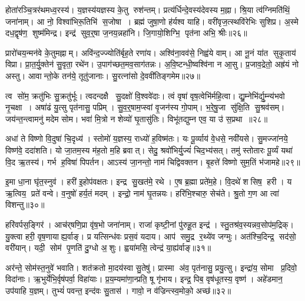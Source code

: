होता॑रञ्चि॒त्रर॑थमध्व॒रस्य॑।
य॒ज्ञस्य॑यज्ञस्य के॒तु रुश॑न्तम्।
प्रत्य॑र्धिन्दे॒वस्य॑देवस्य म॒ह्ना।
श्रि॒या त्व॑ग्निमति॑थिं॒ जना॑नाम्।
आ नो॒ विश्वा॑भिरू॒तिभि॑ स॒जोषा।
ब्रह्म॑ जुषा॒णो ह॑र्यश्व याहि।
वरी॑वृज॒त्स्थवि॑रेभिः सुशिप्र।
अ॒स्मे दध॒द्वृष॑ण॒ शुष्म॑मिन्द्र।
इन्द्र॑ सुव॒र्॒षा ज॒नय॒न्नहा॑नि।
जि॒गायो॒शिग्भि॒ पृत॑ना अभि॒ श्रीः॥२६॥

प्रारो॑चय॒न्मन॑वे के॒तुमह्नाम्।
अवि॑न्द॒ज्ज्योति॑र्बृह॒ते रणा॑य।
अश्वि॑ना॒वव॑से॒ निह्व॑ये वाम्।
आ नू॒नं या॑त सुकृ॒ताय॑ विप्रा।
प्रा॒त॒र्यु॒क्तेन॑ सु॒वृता॒ रथे॑न।
उ॒पाग॑च्छत॒मव॒साग॑तन्नः।
अ॒वि॒ष्टन्धी॒ष्वश्वि॑ना न आ॒सु।
प्र॒जाव॒द्रेतो॒ अह्र॑यं नो अस्तु।
आवान्तो॒के तन॑ये॒ तूतु॑जानाः।
सु॒रत्ना॑सो दे॒ववी॑तिङ्गमेम॥२७॥

त्व सो॑म॒ क्रतु॑भिः सु॒क्रतु॑र्भूः।
त्वदन्दक्षै सु॒दक्षो॑ वि॒श्ववे॑दाः।
त्वं वृषा॑ वृष॒त्वेभि॑र्महि॒त्वा।
द्यु॒म्नेभि॑र्द्यु॒म्न्य॑भवो नृ॒चक्षा।
अषा॑ढं यु॒त्सु पृत॑नासु॒ पप्रिम्।
सु॒व॒र्॒षाम॒प्स्वां वृ॒जन॑स्य गो॒पाम्।
भ॒रे॒षु॒जा सु॑क्षि॒ति सु॒श्रव॑सम्।
जय॑न्त॒न्त्वामनु॑ मदेम सोम।
भवा॑ मि॒त्रो न शेव्यो॑ घृ॒तासु॑तिः।
विभू॑तद्युम्न एव॒ या उ॑ स॒प्रथा॥२८॥

अधा॑ ते विष्णो वि॒दुषा॑ चि॒दृध्य॑।
स्तोमो॑ य॒ज्ञस्य॒ राध्यो॑ ह॒विष्म॑तः।
यः पू॒र्व्याय॑ वे॒धसे॒ नवी॑यसे।
सु॒मज्जा॑नये॒ विष्ण॑वे॒ ददा॑शति।
यो जा॒तम॒स्य म॑ह॒तो म॒हि ब्रवात्।
सेदु॒ श्रवो॑भिर्यु॒ज्यं॑         चिद॒भ्य॑सत्।
तमु॑ स्तोतारः पू॒र्व्यं यथा॑ वि॒द ऋ॒तस्य॑।
गर्भ ह॒विषा॑ पिपर्तन।
आऽस्य॑ जा॒नन्तो॒ नाम॑ चिद्विवक्तन।
बृ॒हत्ते॑ विष्णो सुम॒तिं भ॑जामहे॥२९॥

इ॒मा धा॒ना घृ॑त॒स्नुव॑।
हरी॑ इ॒होप॑वक्षतः।
इन्द्र सु॒खत॑मे॒ रथे।
ए॒ष ब्र॒ह्मा प्रते॑म॒हे।
वि॒दथे॑ शसिष॒ हरी।
य ऋ॒त्विय॒ प्रते॑ वन्वे।
व॒नुषो॑ हर्य॒तं मदम्।
इन्द्रो॒ नाम॑ घृ॒तन्नयः।
हरि॑भि॒श्चारु॒ सेच॑ते।
श्रु॒तो ग॒ण आ त्वा॑ विशन्तु॥३०॥

हरि॑वर्पस॒ङ्गिर॑।
आच॑र्‌षणि॒प्रा वृ॑ष॒भो जना॑नाम्।
राजा॑ कृष्टी॒नां पु॑रुहू॒त इन्द्र॑।
स्तु॒तश्र॑व॒स्यन्नव॒सोप॑म॒द्रिक्।
यु॒क्त्वा हरी॒ वृष॒णायाह्य॒र्वाङ्।
प्र यत्सिन्ध॑वः प्रस॒वं यदाय\sn{}।
आप॑ समु॒द्र र॒थ्ये॑व जग्मुः।
अत॑श्चि॒दिन्द्र॒ सद॑सो॒ वरी॑यान्।
यदी॒ सोम॑ पृ॒णति॑ दु॒ग्धो अ॒शुः।
ह्वया॑मसि॒ त्वेन्द्र॑ या॒ह्य॑र्वाङ्॥३१॥

अर॑न्ते॒ सोम॑स्त॒नुवे॑ भवाति।
शत॑क्रतो मा॒दय॑स्वा सु॒तेषु॑।
प्रास्मा अ॑व॒ पृत॑नासु॒ प्रयु॒त्सु।
इन्द्रा॑य॒ सोमा प्र॒दिवो॒ विदा॑नाः।
ऋ॒भुर्येभि॒र्वृष॑पर्वा॒ विहा॑याः।
प्र॒य॒म्यमा॑णा॒न्प्रति॒ षू गृ॑भाय।
इन्द्र॒ पिब॒ वृष॑धूतस्य॒ वृष्ण॑।
अहे॑डमान॒ उप॑याहि य॒ज्ञम्।
तुभ्यं॑ पवन्त॒ इन्द॑वः सु॒तास॑।
गावो॒ न व॑ज्रिन्त्स्व॒मोको॒ अच्छ॑॥३२॥

